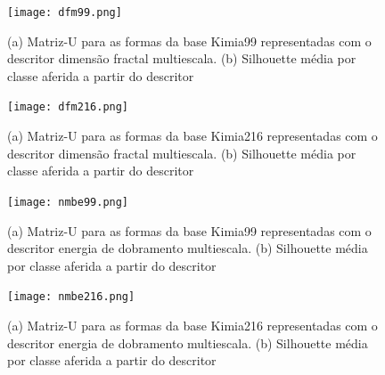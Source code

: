 

\begin{figure}
 \caption{\label{fig:dfm99} (a) Matriz-U para as formas da base Kimia99 representadas com o descritor dimensão fractal multiescala. (b) Silhouette média por classe aferida a partir do descritor}
  \centering
  \texttt{[image: dfm99.png]}
\end{figure}

\begin{figure}
 \caption{\label{fig:dfm216} (a) Matriz-U para as formas da base Kimia216 representadas com o descritor dimensão fractal multiescala. (b) Silhouette média por classe aferida a partir do descritor}
  \centering
  \texttt{[image: dfm216.png]}
\end{figure}

\begin{figure}
 \caption{\label{fig:nmbe99} (a) Matriz-U para as formas da base Kimia99 representadas com o descritor energia de dobramento multiescala. (b) Silhouette média por classe aferida a partir do descritor}
  \centering
  \texttt{[image: nmbe99.png]}
\end{figure}

\begin{figure}
 \caption{\label{fig:nmbe216} (a) Matriz-U para as formas da base Kimia216 representadas com o descritor energia de dobramento multiescala. (b) Silhouette média por classe aferida a partir do descritor}
  \centering
  \texttt{[image: nmbe216.png]}
\end{figure}


